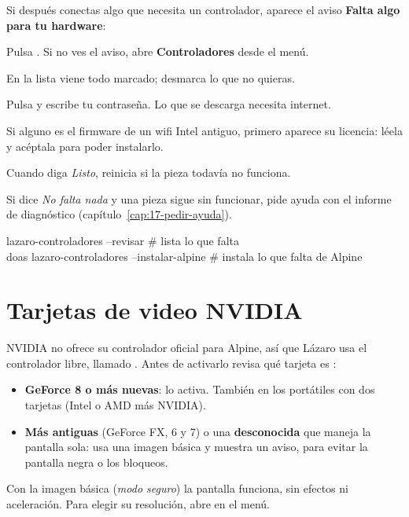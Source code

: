 Si después conectas algo que necesita un controlador, aparece el aviso
\textbf{Falta algo para tu hardware}:
\begin{pasos}
  \item Pulsa . Si no ves el aviso, abre
        \textbf{Controladores} desde el menú.
  \item En la lista viene todo marcado; desmarca lo que no quieras.
  \item Pulsa  y escribe tu contraseña. Lo que se descarga
        necesita internet.
  \item Si alguno es el firmware de un wifi Intel antiguo, primero aparece
        su licencia: léela y acéptala para poder instalarlo.
  \item Cuando diga \emph{Listo}, reinicia si la pieza todavía no funciona.
\end{pasos}

Si dice \emph{No falta nada} y una pieza sigue sin funcionar, pide ayuda
con el informe de diagnóstico (capítulo~\ref{cap:17-pedir-ayuda}).

\begin{terminal}
lazaro-controladores --revisar               \# lista lo que falta\\
doas lazaro-controladores --instalar-alpine  \# instala lo que falta de Alpine
\end{terminal}

\section{Tarjetas de video NVIDIA}\label{sec:nvidia}

NVIDIA no ofrece su controlador oficial para Alpine, así que Lázaro usa
el controlador libre, llamado  \cite{nouveau}. Antes de
activarlo revisa qué tarjeta es \cite{nouveau-codenames}:

\begin{itemize}
  \item \textbf{GeForce 8 o más nuevas}: lo activa. También en los
        portátiles con dos tarjetas (Intel o AMD más NVIDIA).
  \item \textbf{Más antiguas} (GeForce FX, 6 y 7) o una
        \textbf{desconocida} que maneja la pantalla sola: usa una imagen
        básica y muestra un aviso, para evitar la pantalla negra o los
        bloqueos.
\end{itemize}

Con la imagen básica (\emph{modo seguro}) la pantalla funciona, sin
efectos ni aceleración. Para elegir su resolución, abre
 en el menú.

